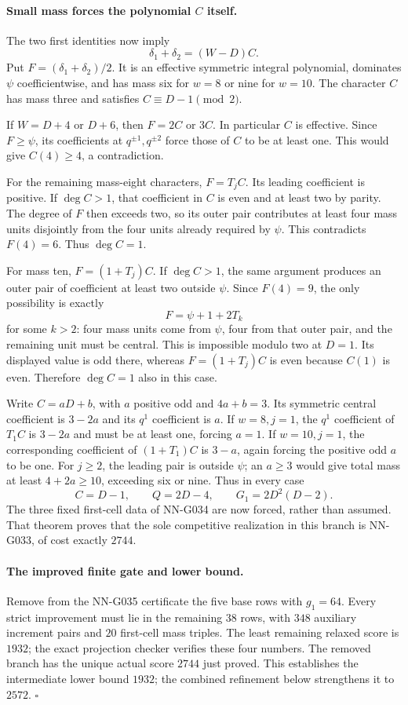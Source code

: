 \paragraph{Small mass forces the polynomial $C$ itself.}
The two first identities now imply
\[
 \delta_1+\delta_2=(W-D)C.
\]
Put $F=(\delta_1+\delta_2)/2$.
It is an effective symmetric integral polynomial,
dominates $\psi$ coefficientwise, and has mass
six for $w=8$ or nine for $w=10$.
The character $C$ has mass three and satisfies
$C\equiv D-1\pmod2$.

If $W=D+4$ or $D+6$, then $F=2C$ or $3C$.
In particular $C$ is effective. Since $F\ge\psi$,
its coefficients at $q^{\pm1},q^{\pm2}$ force
those of $C$ to be at least one. This would give
$C(4)\ge4$, a contradiction.

For the remaining mass-eight characters,
$F=T_jC$. Its leading coefficient is positive.
If $\deg C>1$, that coefficient in $C$ is even
and at least two by parity. The degree of $F$
then exceeds two, so its outer pair contributes
at least four mass units disjointly from the four
units already required by $\psi$. This contradicts
$F(4)=6$. Thus $\deg C=1$.

For mass ten, $F=(1+T_j)C$. If $\deg C>1$,
the same argument produces an outer pair of
coefficient at least two outside $\psi$.
Since $F(4)=9$, the only possibility is exactly
\[
                         F=\psi+1+2T_k
\]
for some $k>2$: four mass units come from $\psi$,
four from that outer pair, and the remaining
unit must be central. This is impossible modulo
two at $D=1$. Its displayed value is odd there,
whereas $F=(1+T_j)C$ is even because $C(1)$ is
even. Therefore $\deg C=1$ also in this case.

Write $C=aD+b$, with $a$ positive odd and
$4a+b=3$. Its symmetric central coefficient is
$3-2a$ and its $q^1$ coefficient is $a$.
If $w=8,j=1$, the $q^1$ coefficient of $T_1C$
is $3-2a$ and must be at least one, forcing $a=1$.
If $w=10,j=1$, the corresponding coefficient of
$(1+T_1)C$ is $3-a$, again forcing the positive
odd $a$ to be one.
For $j\ge2$, the leading pair is outside $\psi$;
an $a\ge3$ would give total mass at least
$4+2a\ge10$, exceeding six or nine.
Thus in every case
\[
                  C=D-1,\qquad Q=2D-4,\qquad
                  G_1=2D^2(D-2).                    \tag{G036.4}
\]
The three fixed first-cell data of NN-G034 are now
forced, rather than assumed. That theorem proves
that the sole competitive realization in this
branch is NN-G033, of cost exactly $2744$.

\paragraph{The improved finite gate and lower bound.}
Remove from the NN-G035 certificate the five base
rows with $g_1=64$. Every strict improvement must
lie in the remaining $38$ rows, with $348$
auxiliary increment pairs and $20$ first-cell
mass triples. The least remaining relaxed score
is $1932$; the exact projection checker verifies
these four numbers. The removed branch has the
unique actual score $2744$ just proved. This establishes
the intermediate lower bound $1932$; the combined
refinement below strengthens it to $2572$.
\hfill$\square$

